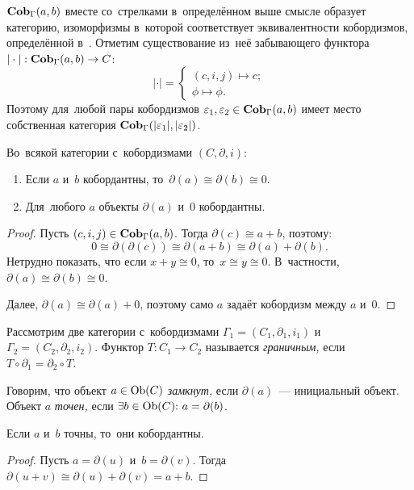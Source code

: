 \documentclass[a4paper,oneside]{article}
\begin{document}
$\mathbf{Cob}_\Gamma(a, b)$ вместе со~стрелками в~определённом выше смысле образует категорию,
изоморфизмы в~которой соответствует эквивалентности кобордизмов, определённой в~\cite{Mil65}.
Отметим существование из~неё забывающего функтора $|\cdot| : \mathbf{Cob}_\Gamma(a, b) \rightarrow C$:
\[
  | \cdot | = \begin{cases}
    (c, i, j) \mapsto c; \\
    \phi \mapsto \phi.
  \end{cases}
\]
Поэтому для~любой пары кобордизмов $\varepsilon_1, \varepsilon_2 \in \mathbf{Cob}_\Gamma(a, b)$
имеет место собственная категория $\mathbf{Cob}_\Gamma(|\varepsilon_1|, |\varepsilon_2|)$.

\begin{statement*}
  Во~всякой категории с~кобордизмами $(C, \partial, i)$:
  \begin{enumerate}
    \item Если $a$ и~$b$ кобордантны, то~$\partial(a) \cong \partial(b) \cong 0$.
    \item Для~любого $a$ объекты $\partial(a)$ и~$0$ кобордантны.
  \end{enumerate}
\end{statement*}

\begin{proof}
  Пусть $(c, i, j) \in \mathbf{Cob}_\Gamma(a, b)$. Тогда $\partial(c) \cong a + b$, поэтому:
  \[
    0 \cong \partial(\partial(c)) \cong \partial(a + b) \cong \partial(a) + \partial(b).
  \]
  Нетрудно показать, что если $x + y \cong 0$, то~$x \cong y \cong 0$.
  В~частности, $\partial(a) \cong \partial(b) \cong 0$.

  Далее, $\partial(a) \cong \partial(a) + 0$, поэтому само $a$ задаёт кобордизм между $a$ и~$0$.
\end{proof}

Рассмотрим две категории с~кобордизмами $\Gamma_1 = (C_1, \partial_1, i_1)$ и~$\Gamma_2 = (C_2, \partial_2, i_2)$.
Функтор $T : C_1 \rightarrow C_2$ называется \textit{граничным,} если $T \circ \partial_1 = \partial_2 \circ T$.

Говорим, что объект $a \in \mathrm{Ob}(C)$ \textit{замкнут,} если $\partial(a)$~— инициальный объект.
Объект $a$ \textit{точен,} если $\exists b \in \Ob(C){:}\ a = \partial(b)$.

\begin{statement*}
  Если $a$ и~$b$ точны, то~они кобордантны.
\end{statement*}

\begin{proof}
  Пусть $a = \partial(u)$ и~$b = \partial(v)$. Тогда $\partial(u + v) \cong \partial(u) + \partial(v) = a + b$.
\end{proof}
\end{document}
